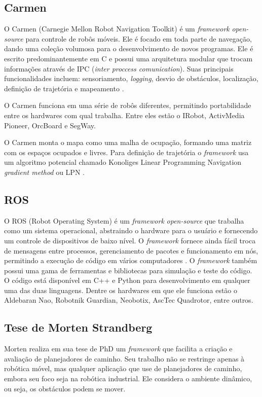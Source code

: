 \subsection{Carmen}

O Carmen (Carnegie Mellon Robot Navigation Toolkit) é um \textit{framework} \textit{open-source} para controle de robôs móveis. Ele é focado em toda parte de navegação, dando uma coleção volumosa para o desenvolvimento de novos programas. Ele é escrito predominantemente em C e possui uma arquitetura modular que trocam informações através de IPC (\textit{inter proccess comunication}). Suas principais funcionalidades incluem: sensoriamento, \textit{logging}, desvio de obstáculos, localização, definição de trajetória e mapeamento \cite{CARMEN_SITE}. 

O Carmen funciona em uma série de robôs diferentes, permitindo portabilidade entre os hardwares com qual trabalha. Entre eles estão o IRobot, ActivMedia Pioneer, OrcBoard e SegWay.

O Carmen monta o mapa como uma malha de ocupação, formando uma matriz com os espaços ocupados e livres. Para definição de trajetória o \textit{framework} usa um algoritmo potencial chamado Konoliges Linear Programming Navigation \textit{gradient method} ou LPN \cite{Thomsen2010}.

\subsection{ROS}

O ROS (Robot Operating System) é um \textit{framework} \textit{open-source} que trabalha como um sistema operacional, abstraindo o hardware para o usuário e fornecendo um controle de dispositivos de baixo nível. O \textit{framework} fornece ainda fácil troca de mensagens entre processos, gerenciamento de pacotes e funcionamento em nós, permitindo a execução de código em vários computadores \cite{ROS_SITE}. O \textit{framework} também possui uma gama de ferramentas e bibliotecas para simulação e teste do código. O código está disponível em C++ e Python para desenvolvimento em qualquer uma das duas linguagens. Dentre os hardwares em que ele funciona estão o Aldebaran Nao, Robotnik Guardian, Neobotix, AscTec Quadrotor, entre outros.

\subsection{Tese de Morten Strandberg}

Morten \cite{Strandberg2004} realiza em sua tese de PhD um \textit{framework} que facilita a criação e avaliação de planejadores de caminho. Seu trabalho não se restringe apenas à robótica móvel, mas qualquer aplicação que use de planejadores de caminho, embora seu foco seja na robótica industrial. Ele considera o ambiente dinâmico, ou seja, os obstáculos podem se mover.

